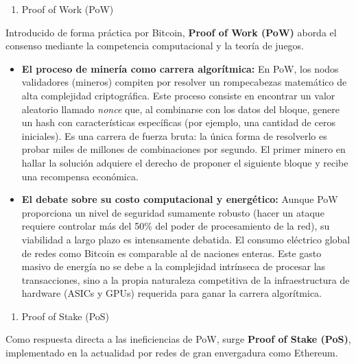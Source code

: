 \documentclass[12pt,a4paper]{article}
\begin{document}
\begin{enumerate}[label=\alph*.]
    \item Proof of Work (PoW)
\end{enumerate}

Introducido de forma práctica por Bitcoin, \textbf{Proof of Work (PoW)} aborda el consenso mediante la competencia computacional y la teoría de juegos.

\begin{itemize}
    \item \textbf{El proceso de minería como carrera algorítmica:} En PoW, los nodos validadores (mineros) compiten por resolver un rompecabezas matemático de alta complejidad criptográfica. Este proceso consiste en encontrar un valor aleatorio llamado \textit{nonce} que, al combinarse con los datos del bloque, genere un hash con características específicas (por ejemplo, una cantidad de ceros iniciales). Es una carrera de fuerza bruta: la única forma de resolverlo es probar miles de millones de combinaciones por segundo. El primer minero en hallar la solución adquiere el derecho de proponer el siguiente bloque y recibe una recompensa económica.
    \item \textbf{El debate sobre su costo computacional y energético:} Aunque PoW proporciona un nivel de seguridad sumamente robusto (hacer un ataque requiere controlar más del 50\% del poder de procesamiento de la red), su viabilidad a largo plazo es intensamente debatida. El consumo eléctrico global de redes como Bitcoin es comparable al de naciones enteras. Este gasto masivo de energía no se debe a la complejidad intrínseca de procesar las transacciones, sino a la propia naturaleza competitiva de la infraestructura de hardware (ASICs y GPUs) requerida para ganar la carrera algorítmica.
\end{itemize}

\begin{enumerate}[label=\alph*., start=2]
    \item Proof of Stake (PoS)
\end{enumerate}

Como respuesta directa a las ineficiencias de PoW, surge \textbf{Proof of Stake (PoS)}, implementado en la actualidad por redes de gran envergadura como Ethereum.
\end{document}
